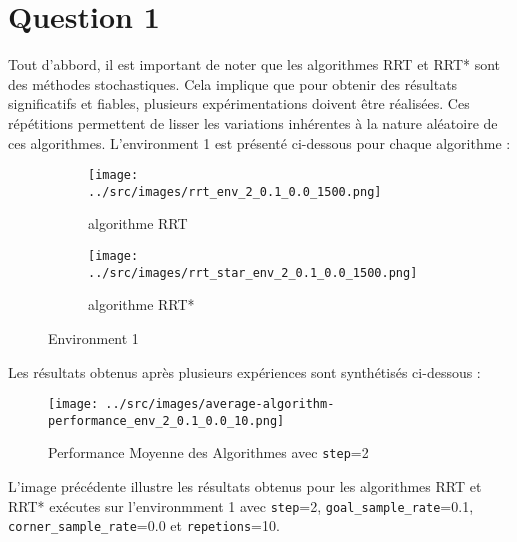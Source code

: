 \documentclass[../CSC_5RO16_TA_TP2.tex]{subfiles}
\begin{document}
\section{Question 1}
\noindent Tout d'abbord, il est important de noter que les algorithmes \textcolor{graph_blue}{RRT} et \textcolor{graph_orange}{RRT*} sont des méthodes stochastiques. Cela implique que pour obtenir des résultats significatifs et fiables, plusieurs expérimentations doivent être réalisées. Ces répétitions permettent de lisser les variations inhérentes à la nature aléatoire de ces algorithmes. L'environment 1 est présenté ci-dessous pour chaque algorithme :
\begin{figure}[H]
    \centering
    \begin{subfigure}[b]{0.495\textwidth}
        \centering
        \texttt{[image: ../src/images/rrt\_env\_2\_0.1\_0.0\_1500.png]}
        \caption{algorithme \textcolor{graph_blue}{RRT}}
        \label{}
    \end{subfigure}\hfill
    \begin{subfigure}[b]{0.495\textwidth}
        \centering
        \texttt{[image: ../src/images/rrt\_star\_env\_2\_0.1\_0.0\_1500.png]}
        \caption{algorithme \textcolor{graph_orange}{RRT*}}
        \label{}
    \end{subfigure}
    \caption{Environment 1}
    \label{}
\end{figure}
\noindent Les résultats obtenus après plusieurs expériences sont synthétisés ci-dessous :
\begin{figure}[H]
    \centering
	\texttt{[image: ../src/images/average-algorithm-performance\_env\_2\_0.1\_0.0\_10.png]}
	\caption{Performance Moyenne des Algorithmes avec \texttt{step}=2}
	\label{}
\end{figure}
\noindent L'image précédente illustre les résultats obtenus pour les algorithmes \textcolor{graph_blue}{RRT} et \textcolor{graph_orange}{RRT*} exécutes sur l'environmment 1 avec \texttt{step}=2, \texttt{goal\_sample\_rate}=0.1, \texttt{corner\_sample\_rate}=0.0 et \texttt{repetions}=10.\\
\end{document}
